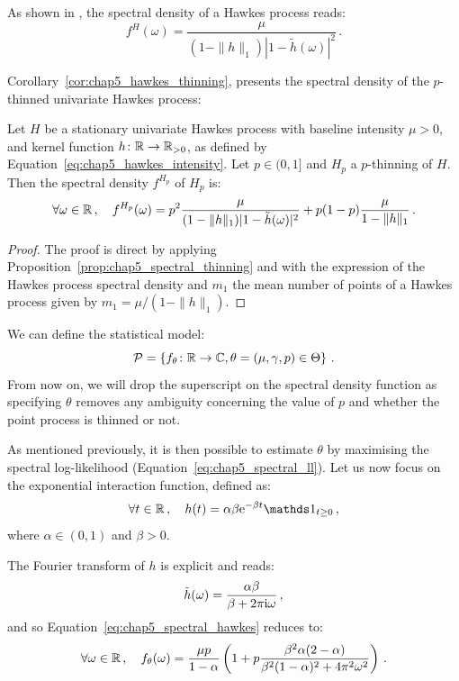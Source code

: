     As shown in \textcite{Hawkes1971}, the spectral density of a Hawkes process reads:
    \[f^H(\omega) = \frac{\mu}{(1-\|h\|_1)|1-\tilde h(\omega)|^2}\,.\]

    Corollary~\ref{cor:chap5_hawkes_thinning}, presents the spectral density of the $p$-thinned univariate Hawkes process:

    \begin{corollary}\label{cor:chap5_hawkes_thinning}
        Let $H$ be a stationary univariate Hawkes process with baseline intensity $\mu > 0$, and kernel function $h\colon {\mathbb R}\to {\mathbb R}_{>0}$,
        as defined by Equation~\eqref{eq:chap5_hawkes_intensity}. Let $p\in(0,1]$ and $H_p$ a $p$-thinning of $H$. 
        Then the spectral density $f^{H_p}$ of $H_p$ is:
        \begin{equation}\label{eq:chap5_spectral_hawkes}
            \forall \omega \in {\mathbb R}\,, \quad f^{H_p}(\omega) = p^2 \frac{\mu}{(1-\|h\|_1)|1-\tilde h(\omega)|^2} + p(1-p)\frac{\mu}{1-\|h\|_1}\,.
        \end{equation}
    \end{corollary}
    \begin{proof}
        The proof is direct by applying Proposition~\ref{prop:chap5_spectral_thinning} and 
        with the expression of the Hawkes process spectral density and $m_1$ the mean number of points of a Hawkes process given by $m_1 = \mu/(1-\|h\|_1)$.
    \end{proof}
    We can define the statistical model:
    \[\mathcal{P} = 
      \left\{
        f_\theta \colon {\mathbb R} \to {\mathbb C}, \theta = (\mu, \gamma, p) \in \Theta
      \right\}\,.
    \]
    From now on, we will drop the superscript on the spectral density function as specifying $\theta$ removes any ambiguity concerning the value of $p$ and whether the point process is thinned or not.

    As mentioned previously, it is then possible to estimate $\theta$ by maximising the spectral log-likelihood (Equation~\eqref{eq:chap5_spectral_ll}).
    Let us now focus on the exponential interaction function, defined as:
    \[\forall t\in\RR\,,\quad h(t) = \alpha \beta \mathrm{e}^{-\beta t}\II_{t\geq 0}\,,\]
    where $\alpha \in(0,1)$ and $\beta > 0$.

    The Fourier transform of $h$ is explicit and reads:
    \[\tilde h (\omega) = \frac{\alpha \beta}{\beta + 2 \pi \mathrm{i} \omega}\,,\]
    and so Equation~\eqref{eq:chap5_spectral_hawkes} reduces to:
    \begin{equation}\label{eq:chap5_spectral_exponential}
        \forall \omega\in{\mathbb R}\,,\quad
        f_{\theta}(\omega) = \frac{\mu p }{1-\alpha}\left(1 + p \frac{\beta^2 \alpha (2-\alpha)}{\beta^2(1-\alpha)^2 + 4 \pi^2 \omega^2}\right)\,.
    \end{equation}

